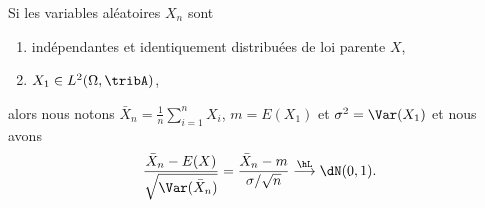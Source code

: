 \begin{theorem}     \label{ThoOWodAi}
	Si les variables aléatoires \( X_n\) sont
	\begin{enumerate}
		\item
		      indépendantes et identiquement distribuées de loi parente \( X\),
		\item
		      \( X_1\in L^2(\Omega,\tribA)\),
	\end{enumerate}
	alors nous notons \( \bar X_n=\frac{1}{ n }\sum_{i=1}^{n}X_i\), \( m=E(X_1)\) et \( \sigma^2=\Var(X_1)\) et nous avons
	\begin{equation}
		\frac{ \bar X_n-E(X) }{ \sqrt{\Var(\bar X_n)} }=\frac{ \bar X_n-m }{ \sigma/\sqrt{n} }\stackrel{\hL}{\longrightarrow}\dN(0,1).
	\end{equation}
\end{theorem}

